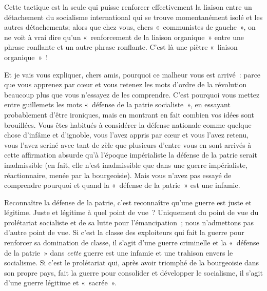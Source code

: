 \documentclass[french,twoside]{book} %
\begin{document}
Cette tactique est la seule qui puisse renforcer effectivement la liaison entre un détachement du socialisme international qui se trouve momentanément isolé et les autres détachements; alors que chez vous, chers « communistes de gauche », on ne voit à vrai dire qu’un « renforcement de la liaison organique » entre une phrase ronflante et un autre phrase ronflante. C'est là une piètre « liaison organique » !\par
Et je vais vous expliquer, chers amis, pourquoi ce malheur vous est arrivé : parce que vous apprenez par cœur et vous retenez les mots d’ordre de la révolution beaucoup plus que vous n’essayez de les comprendre. C'est pourquoi vous mettez entre guillemets les mots « défense de la patrie socialiste », en essayant probablement d’être ironiques, mais en montrant en fait combien vos idées sont brouillées. Vous êtes habitués à considérer la défense nationale comme quelque chose d’infâme et d’ignoble, vous l’avez appris par cœur et vous l’avez retenu, vous l’avez seriné avec tant de zèle que plusieurs d’entre vous en sont arrivés à cette affirmation absurde qu’à l’époque impérialiste la défense de la patrie serait inadmissible (en fait, elle n’est inadmissible que dans une guerre impérialiste, réactionnaire, menée par la bourgeoisie). Mais vous n’avez pas essayé de comprendre pourquoi et quand la « défense de la patrie » est une infamie.\par
Reconnaître la défense de la patrie, c’est reconnaître qu’une guerre est juste et légitime. Juste et légitime à quel point de vue ? Uniquement du point de vue du prolétariat socialiste et de sa lutte pour l’émancipation ; nous n’admettons pas d’autre point de vue. Si c’est la classe des exploiteurs qui fait la guerre pour renforcer sa domination de classe, il s’agit d’une guerre criminelle et la « défense de la patrie » dans \emph{cette} guerre est une infamie et une trahison envers le socialisme. Si c’est le prolétariat qui, après avoir triomphé de la bourgeoisie dans son propre pays, fait la guerre pour consolider et développer le socialisme, il s’agit d’une guerre légitime et « sacrée ».\par
\end{document}
